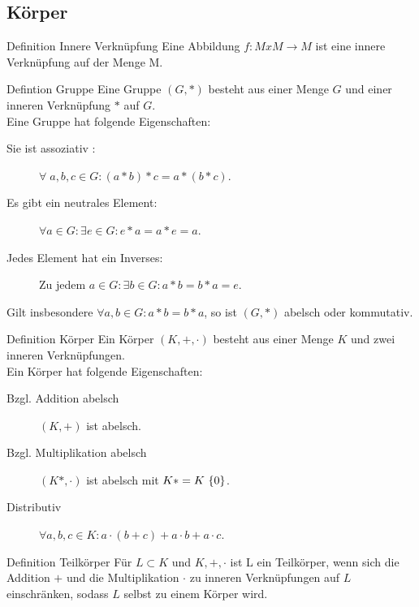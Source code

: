\documentclass[a6paper,11pt,print,grid=front]{kartei}
\begin{document}
\subsection*{Körper}
\begin{karte}{Definition Innere Verknüpfung}
    Eine Abbildung \(f: M x M \rightarrow M\) 
    ist eine innere Verknüpfung auf der Menge M.
\end{karte}
\begin{karte}{Defintion Gruppe}
    Eine Gruppe \( (G,*) \) besteht aus einer Menge 
    \(G\) und einer inneren Verknüpfung \(*\) auf \(G\).\\
    Eine Gruppe hat folgende Eigenschaften: 
    \begin{description}
        \item[Sie ist assoziativ :] \(\forall \; a,b,c \in G : (a * b) * c = a * (b * c)\).
        \item[Es gibt ein neutrales Element:] \(\forall a \in G : \exists e \in G : e*a = a*e = a\).
        \item[Jedes Element hat ein Inverses:] Zu jedem \(a \in G : \exists b \in G : a * b = b * a = e\). 
    \end{description}
    Gilt insbesondere \(\forall a,b \in G : a * b = b * a \), so ist 
    \((G,*)\) abelsch oder kommutativ. 
\end{karte}
\begin{karte}{Definition Körper}
    Ein Körper \((K,+,\cdot)\) besteht aus einer Menge \(K\) und zwei 
    inneren Verknüpfungen. \\
    Ein Körper hat folgende Eigenschaften: 
    \begin{description}
        \item[Bzgl. Addition abelsch]\((K,+)\) ist abelsch.
        \item[Bzgl. Multiplikation abelsch]\((K*,\cdot)\) ist abelsch mit \(K* = K \ \{0\}\).
        \item[Distributiv]\(\forall a,b,c \in K : a \cdot (b + c) + a \cdot b + a \cdot c\).   
    \end{description}
\end{karte}
\begin{karte}{Definition Teilkörper}
    Für \(L \subset K\) und \(K,+,\cdot\) ist L ein Teilkörper, 
    wenn sich die Addition \(+\) und die Multiplikation \(\cdot\) 
    zu inneren Verknüpfungen auf \(L\) einschränken, sodass \(L\)
    selbst zu einem Körper wird.
\end{karte}
\end{document}
